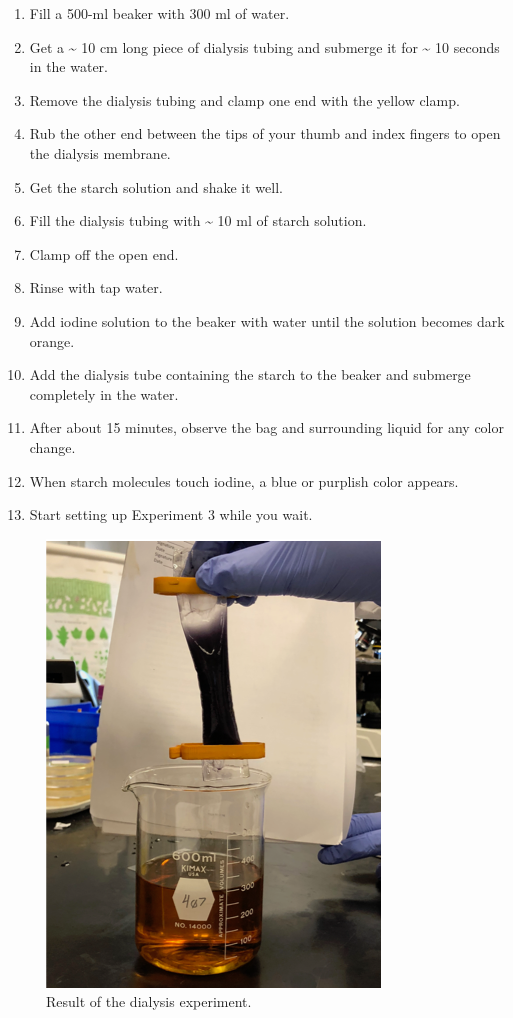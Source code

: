 \begin{enumerate}
\def\labelenumi{\arabic{enumi}.}
\tightlist
\item
  Fill a 500-ml beaker with 300 ml of water.
\item
  Get a \textasciitilde{} 10 cm long piece of dialysis tubing and
  submerge it for \textasciitilde{} 10 seconds in the water.
\item
  Remove the dialysis tubing and clamp one end with the yellow clamp.
\item
  Rub the other end between the tips of your thumb and index fingers to
  open the dialysis membrane.
\item
  Get the starch solution and shake it well.
\item
  Fill the dialysis tubing with \textasciitilde{} 10 ml of starch
  solution.
\item
  Clamp off the open end.
\item
  Rinse with tap water.
\item
  Add iodine solution to the beaker with water until the solution
  becomes dark orange.
\item
  Add the dialysis tube containing the starch to the beaker and submerge
  completely in the water.
\item
  After about 15 minutes, observe the bag and surrounding liquid for any
  color change.
\item
  When starch molecules touch iodine, a blue or purplish color appears.
\item
  Start setting up Experiment 3 while you wait.
\end{enumerate}

\begin{figure}

{\centering \includegraphics[width=0.7\linewidth]{./figures/exchange/Dialysis}

}

\caption{Result of the dialysis experiment.}\label{fig:dialysis}
\end{figure}

